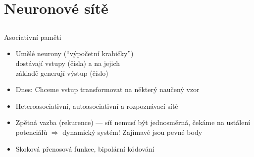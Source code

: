 \documentclass{beamer}
\begin{document}
\section{Neuronové sítě}

\subsection{}
\begin{frame}{Asociativní paměti}
\begin{itemize}
\item Umělé neurony (``výpočetní krabičky'') \\ dostávají vstupy (čísla) a na jejich \\ základě generují výstup (číslo)
\item Dnes: Chceme vstup transformovat na některý naučený vzor
\item Heteroasociativní, autoasociativní a rozpoznávací sítě
\item Zpětná vazba (rekurence) --- síť nemusí být jednosměrná,
	čekáme na ustálení potenciálů $\Rightarrow$ dynamický systém!
	Zajímavé jsou pevné body
\item Skoková přenosová funkce, bipolární kódování
\end{itemize}
\end{frame}
\end{document}
